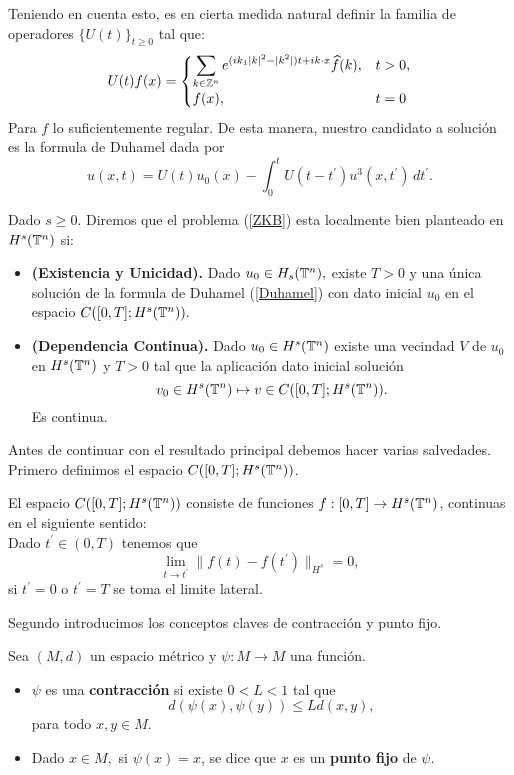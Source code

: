 Teniendo en cuenta esto, es en cierta medida natural definir la familia de operadores $\{U(t)\}_{t\geq 0}$ tal que:
$$U(t)f(x)=\begin{cases}
    \displaystyle\sum_{k\in\mathbb{Z}^n}e^{(ik_1|k|^2-|k^2|)t+ik\cdot x}\widehat{f}(k), & t>0,\\
    f(x), &t=0
\end{cases}$$
Para $f$ lo suficientemente regular. De esta manera, nuestro candidato a solución es la formula de Duhamel dada por
\begin{equation}\label{Duhamel}
u(x,t)=U(t)u_0(x)-\int_0^tU(t-t^\prime)u^3(x,t^\prime)\,dt^\prime.
\end{equation}
\begin{definition}
    Dado $s\geq 0.$ Diremos que el problema (\ref{ZKB}) esta localmente bien planteado en $H^s(\mathbb{T}^n)$ si:
    \begin{itemize}
        \item \textbf{(Existencia y Unicidad).} Dado $u_0\in H_s(\mathbb{T}^n),$ existe $T>0$ y una única solución de la formula de Duhamel (\ref{Duhamel}) con dato inicial $u_0$ en el espacio $C([0,T];H^s(\mathbb{T}^n)).$
        \item \textbf{(Dependencia Continua).} Dado $u_0\in H^s(\mathbb{T}^n)$ existe una vecindad $V$ de $u_0$ en $H^s(\mathbb{T}^n)$ y $T>0$ tal que la aplicación dato inicial solución 
        $$v_0\in H^s(\mathbb{T}^n)\mapsto v\in C([0,T];H^s(\mathbb{T}^n)). $$ 
        Es continua.
    \end{itemize}
\end{definition}
Antes de continuar con el resultado principal debemos hacer varias salvedades. Primero definimos el espacio $C([0,T];H^s(\mathbb{T}^n))$.
\begin{definition}
     El espacio $C([0,T];H^s(\mathbb{T}^n))$ consiste de funciones $f:[0,T]\to H^s(\mathbb{T}^n)$, continuas en el siguiente sentido:\\ 
 Dado $t^\prime\in(0,T)$ tenemos que
$$\lim_{t\to t^\prime}\|f(t)-f(t^\prime)\|_{H^s}=0,$$
si $t^\prime=0$ o $t^\prime=T$ se toma el limite lateral.
 \end{definition} 
Segundo introducimos los conceptos claves de contracción y punto fijo.  
\begin{definition}Sea $(M,d)$ un espacio métrico y $\psi:M\to M$ una función.
    \begin{itemize}
        \item $\psi$ es una \textbf{contracción} si existe $0<L<1$ tal que
        $$d(\psi(x),\psi(y))\leq Ld(x,y),$$
        para todo $x,y\in M.$
        \item Dado $x\in M,$ si $\psi(x)=x$, se dice que $x$ es un \textbf{punto fijo} de $\psi.$
    \end{itemize}
\end{definition}
